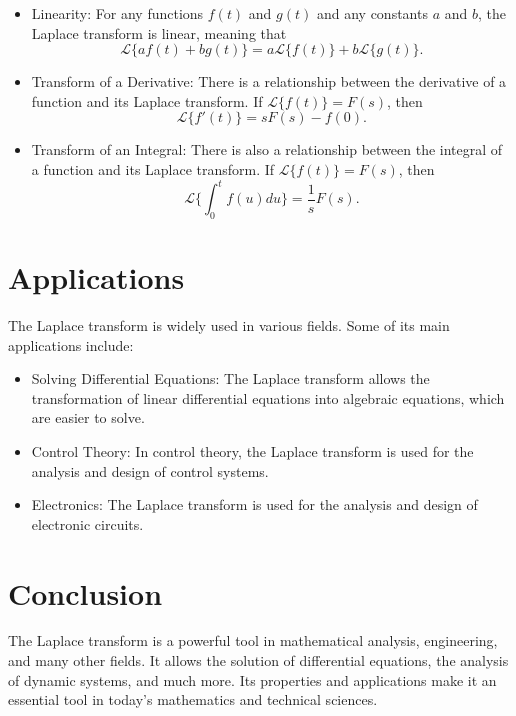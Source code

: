 \documentclass{article}
\begin{document}
\begin{itemize}
\item Linearity: For any functions $f(t)$ and $g(t)$ and any constants $a$ and $b$, the Laplace transform is linear, meaning that
\begin{equation}
\mathcal{L}\{af(t) + bg(t)\} = a\mathcal{L}\{f(t)\} + b\mathcal{L}\{g(t)\}.
\end{equation}

\item Transform of a Derivative: There is a relationship between the derivative of a function and its Laplace transform. If $\mathcal{L}\{f(t)\} = F(s)$, then
\begin{equation}
\mathcal{L}\{f'(t)\} = sF(s) - f(0).
\end{equation}

\item Transform of an Integral: There is also a relationship between the integral of a function and its Laplace transform. If $\mathcal{L}\{f(t)\} = F(s)$, then
\begin{equation}
\mathcal{L}\{\int_{0}^{t} f(u) du\} = \frac{1}{s}F(s).
\end{equation}
\end{itemize}

\section{Applications}

The Laplace transform is widely used in various fields. Some of its main applications include:

\begin{itemize}
\item Solving Differential Equations: The Laplace transform allows the transformation of linear differential equations into algebraic equations, which are easier to solve.

\item Control Theory: In control theory, the Laplace transform is used for the analysis and design of control systems.

\item Electronics: The Laplace transform is used for the analysis and design of electronic circuits.

\end{itemize}

\section{Conclusion}

The Laplace transform is a powerful tool in mathematical analysis, engineering, and many other fields. It allows the solution of differential equations, the analysis of dynamic systems, and much more. Its properties and applications make it an essential tool in today's mathematics and technical sciences.
\end{document}
